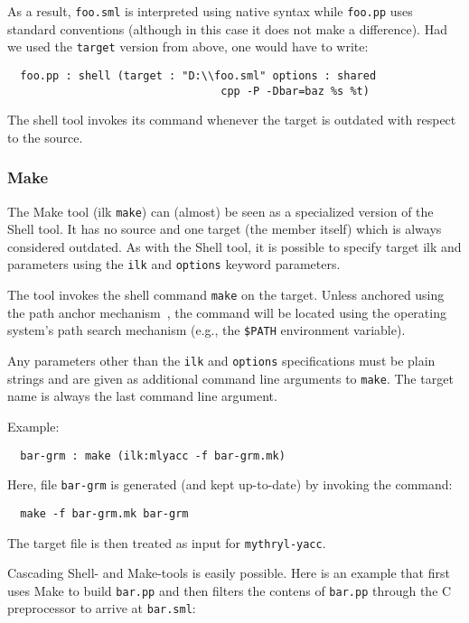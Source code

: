 \noindent As a result, {\tt foo.sml} is interpreted using native
syntax while {\tt foo.pp} uses standard conventions (although in this
case it does not make a difference).  Had we used the {\tt target}
version from above, one would have to write:

\begin{verbatim}
  foo.pp : shell (target : "D:\\foo.sml" options : shared
                                 cpp -P -Dbar=baz %s %t)
\end{verbatim}

The shell tool invokes its command whenever the target is outdated
with respect to the source.

\subsubsection{Make}

The Make tool (ilk {\tt make}) can (almost) be seen as a specialized
version of the Shell tool.  It has no source and one target (the
member itself) which is always considered outdated.  As with the Shell
tool, it is possible to specify target ilk and parameters using the
{\tt ilk} and {\tt options} keyword parameters.

The tool invokes the shell command {\tt make} on the target.  Unless
anchored using the path anchor mechanism~, the
command will be located using the operating system's path search
mechanism (e.g., the {\tt \$PATH} environment variable).

Any parameters other than the {\tt ilk} and {\tt options}
specifications must be plain strings and are given as additional
command line arguments to {\tt make}.  The target name is always the
last command line argument.

Example:

\begin{verbatim}
  bar-grm : make (ilk:mlyacc -f bar-grm.mk)
\end{verbatim}

Here, file {\tt bar-grm} is generated (and kept up-to-date) by
invoking the command:
\begin{verbatim}
  make -f bar-grm.mk bar-grm
\end{verbatim}
\noindent The target file is then treated as input for {\tt mythryl-yacc}.

Cascading Shell- and Make-tools is easily possible.  Here is an
example that first uses Make to build {\tt bar.pp} and then filters
the contens of {\tt bar.pp} through the C preprocessor to arrive at
{\tt bar.sml}:

